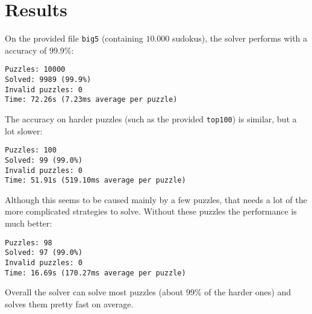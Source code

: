 \documentclass[11pt, a4paper, fleqn]{article}
\begin{document}
\section{Results}
On the provided file \texttt{big5} (containing $10.000$ sudokus), the solver performs with a 
accuracy of $99.9\%$:
\begin{verbatim}
Puzzles: 10000
Solved: 9989 (99.9%)
Invalid puzzles: 0
Time: 72.26s (7.23ms average per puzzle)
\end{verbatim}

The accuracy on harder puzzles (such as the provided \texttt{top100}) is similar,
but a lot slower:
\begin{verbatim}
Puzzles: 100
Solved: 99 (99.0%)
Invalid puzzles: 0
Time: 51.91s (519.10ms average per puzzle)
\end{verbatim}

Although this seems to be caused mainly by a few puzzles, that needs a lot of the
more complicated strategies to solve. Without these puzzles the performance is much
better:
\begin{verbatim}
Puzzles: 98
Solved: 97 (99.0%)
Invalid puzzles: 0
Time: 16.69s (170.27ms average per puzzle)
\end{verbatim}

Overall the solver can solve most puzzles (about 99\% of the harder ones) and solves them pretty fast on average.
\end{document}
